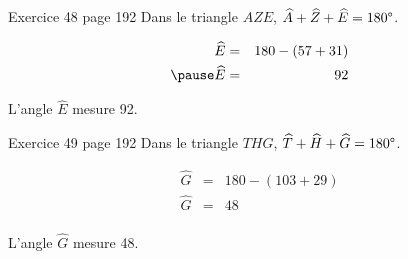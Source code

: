 \documentclass[xcolor={dvipsnames}]{beamer}
\begin{document}
\begin{frame}
	
	\begin{block}{Exercice 48 page 192}
		Dans le triangle $AZE$, $\widehat{A} + \widehat{Z} + \widehat{E} = 180\degree$. \pause %
		
		\vspace*{-0.5cm}
		\begin{eqnarray*}
			\widehat{E} &=& 180 - (57 + 31)\\ \pause
			\widehat{E} &=& 92\\
		\end{eqnarray*}
		\vspace*{-0.75cm}
		
		L'angle $\widehat{E}$ mesure 92\degree.\pause
	\end{block}
	
	\begin{block}{Exercice 49 page 192}
		Dans le triangle $THG$, $\widehat{T} + \widehat{H} + \widehat{G} = 180\degree$.\pause %
		
		\vspace*{-0.5cm}
		\begin{eqnarray*}
		\widehat{G} &=& 180 - (103 + 29)\\
		\widehat{G} &=& 48\\
		\end{eqnarray*}
		\vspace*{-0.75cm}
		
		L'angle $\widehat{G}$ mesure 48\degree.\pause
	\end{block}
	
	
	
\end{frame}
\end{document}

